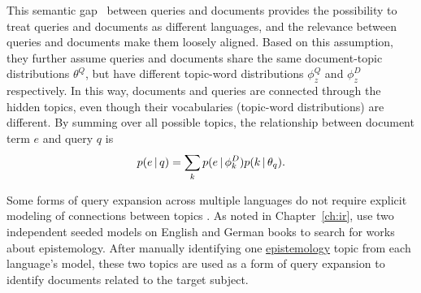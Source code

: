 This semantic gap~\citep{Muller-2009} between queries and documents
provides the possibility to treat queries and documents as different languages, and the relevance between
queries and documents make them loosely aligned. Based on this assumption, 
they further assume queries and documents share the same document-topic
distributions $\theta^Q$, but have different topic-word distributions
$\phi_z^Q$ and $\phi_z^D$ respectively.
In this way, documents and queries are
connected through the hidden topics, even though their vocabularies
(topic-word distributions) are different. By summing over all possible
topics, the relationship between document term $e$ and query $q$ is
\begin{align}
p(e \, | \, q) = \sum_k p(e \, | \, \phi_k^D) p(k \, | \, \theta_q).
\end{align}


Some forms of query expansion across multiple languages do not require
explicit modeling of connections between topics \citep{vulic2011crosslanguage,vulic2015probabilistic}.  As noted in
Chapter~\ref{ch:ir}, \citet{erlin2017topic} use two independent seeded
models on English and German books to search for works about
epistemology.  After manually identifying one \underline{epistemology}
topic from each language's model, these two topics are used as a form
of query expansion to identify documents related to the target
subject.

